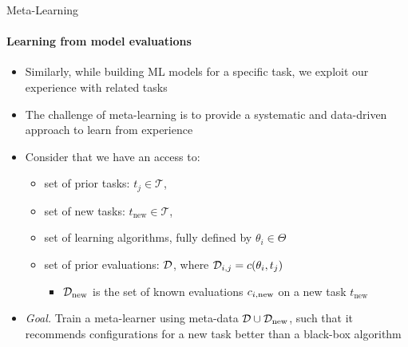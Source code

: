 
\begin{frame}[c]{Meta-Learning}
\framesubtitle{Learning from model evaluations}

\begin{itemize}
    \item Similarly, while building ML models for a specific task, we exploit our experience with related tasks
    \item The challenge of meta-learning is to provide a systematic and data-driven approach to learn from experience 
    \item Consider that we have an access to:
        \begin{itemize}
            \item set of prior tasks: $t_{j} \in \mathcal{T}$,
            \item set of new tasks: $t_{\text{new}} \in \mathcal{T}$,
            \item set of learning algorithms, fully defined by $\theta_{i} \in \Theta$
            \item set of prior evaluations: $\mathcal{D}$, where $\mathcal{D}_{i, j} = c(\theta_{i}, t_{j})$
            \begin{itemize}
                \item $\mathcal{D}_{\text{new}}$ is the set of known evaluations $c_{i, \text{new}}$ on a new task $t_{\text{new}}$
            \end{itemize}
        \end{itemize}
    \item \emph{Goal.} Train a meta-learner using meta-data $\mathcal{D} \cup \mathcal{D}_{\text{new}}$, such that it recommends configurations for a new task better than a black-box algorithm
\end{itemize}


\end{frame}

